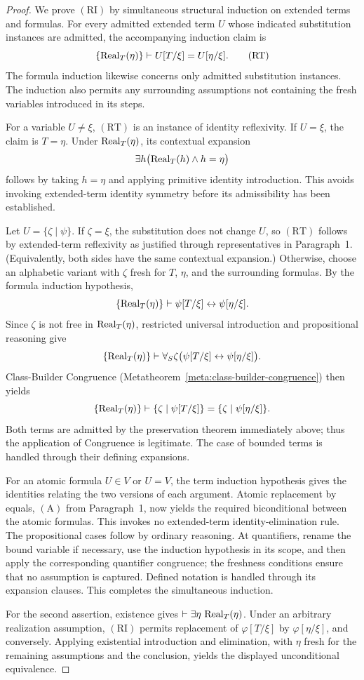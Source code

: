 \begin{proof}
We prove \((\mathrm{RI})\) by simultaneous structural induction on
extended terms and formulas. For every admitted extended term
\(U\) whose indicated substitution instances are admitted,
the accompanying induction claim is
\[
\{\operatorname{Real}_T(\eta)\}\vdash
U[T/\xi]=U[\eta/\xi].
\tag{RT}
\]
The formula induction likewise concerns only admitted
substitution instances. The induction also permits any
surrounding assumptions not containing the fresh variables
introduced in its steps.

For a variable \(U\ne\xi\), \((\mathrm{RT})\) is an instance
of identity reflexivity. If \(U=\xi\), the claim is \(T=\eta\). Under
\(\operatorname{Real}_T(\eta)\), its contextual expansion
\[
\exists h\bigl(\operatorname{Real}_T(h)\land h=\eta\bigr)
\]
follows by taking \(h=\eta\) and applying primitive
identity introduction. This avoids invoking extended-term
identity symmetry before its admissibility has been established.

Let \(U=\{\zeta\mid\psi\}\). If \(\zeta=\xi\), the
substitution does not change \(U\), so \((\mathrm{RT})\)
follows by extended-term reflexivity as justified through
representatives in Paragraph~1. (Equivalently, both sides have
the same contextual expansion.) Otherwise, choose an alphabetic
variant with \(\zeta\) fresh for \(T\), \(\eta\), and the
surrounding formulas. By the formula induction hypothesis,
\[
\{\operatorname{Real}_T(\eta)\}\vdash
\psi[T/\xi]\leftrightarrow\psi[\eta/\xi].
\]
Since \(\zeta\) is not free in \(\operatorname{Real}_T(\eta)\), restricted
universal introduction and propositional reasoning give
\[
\{\operatorname{Real}_T(\eta)\}\vdash
\forall_S\zeta\bigl(
\psi[T/\xi]\leftrightarrow\psi[\eta/\xi]
\bigr).
\]
Class-Builder Congruence
(Metatheorem~\ref{meta:class-builder-congruence}) then yields
\[
\{\operatorname{Real}_T(\eta)\}\vdash
\{\zeta\mid\psi[T/\xi]\}
=
\{\zeta\mid\psi[\eta/\xi]\}.
\]
Both terms are admitted by the preservation theorem immediately
above; thus the application of Congruence is legitimate. The case
of bounded terms is handled through their defining expansions.

For an atomic formula \(U\in V\) or \(U=V\), the term
induction hypothesis gives the identities relating the two
versions of each argument. Atomic replacement by equals,
\((\mathrm{A})\) from Paragraph~1, now yields the required
biconditional between the atomic formulas. This invokes no
extended-term identity-elimination rule. The propositional cases
follow by ordinary reasoning. At quantifiers, rename the bound
variable if necessary, use the induction hypothesis in its scope,
and then apply the corresponding quantifier congruence; the
freshness conditions ensure that no assumption is captured.
Defined notation is handled through its expansion clauses.
This completes the simultaneous induction.

For the second assertion, existence gives
\(\vdash\exists\eta\,\operatorname{Real}_T(\eta)\). Under an arbitrary
realization assumption, \((\mathrm{RI})\) permits replacement
of \(\varphi[T/\xi]\) by \(\varphi[\eta/\xi]\), and
conversely. Applying existential introduction and elimination,
with \(\eta\) fresh for the remaining assumptions and the
conclusion, yields the displayed unconditional equivalence.
\end{proof}

